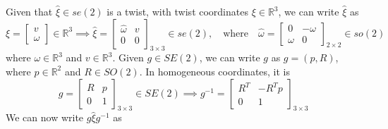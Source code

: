 Given that \( \widehat{\xi} \in s e(2) \) is a twist, with twist coordinates \( \xi \in \mathbb{R}^{3} \), we can write \( \widehat{\xi} \) as
\begin{equation}\label{eq:twist-2D}
    \xi
    =
    \begin{bmatrix}
        v \\
        \omega
    \end{bmatrix}
    \in \mathbb{R}^{3}
    \implies
    \widehat{\xi}
    =
    \begin{bmatrix}
        \widehat{\omega} & v \\
        0                & 0
    \end{bmatrix}_{3 \times 3}
    \in s e(2),
    \quad
    \text{where}
    \quad
    \widehat{\omega}
    =
    \begin{bmatrix}
        0      & -\omega \\
        \omega & 0
    \end{bmatrix}_{2 \times 2}
    \in s o(2)
\end{equation}
where \( \omega \in \mathbb{R}^{3} \) and \( v \in \mathbb{R}^{3} \).
Given \( g \in S E(2) \), we can write \( g \) as \( g = (p, R) \), where \( p \in \mathbb{R}^{2} \) and \( R \in S O(2) \).
In homogeneous coordinates, it is
\begin{equation*}
    g
    =
    \begin{bmatrix}
        R & p \\
        0 & 1
    \end{bmatrix}_{3 \times 3}
    \in S E(2)
    \implies
    g^{-1}
    =
    \begin{bmatrix}
        R^{T} & -R^{T} p \\
        0     & 1
    \end{bmatrix}_{3 \times 3}
\end{equation*}
We can now write \( g \widehat{\xi} g^{-1} \) as
